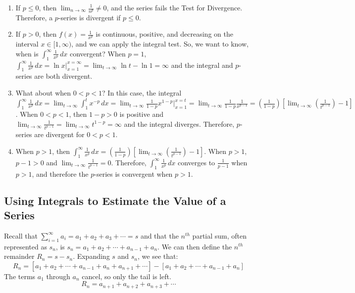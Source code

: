 \begin{Answer}[ref = pseries]
\begin{enumerate}
\item If $p \leq 0$, then $\lim_{n \to \infty} \frac{1}{n^p} \neq 0$, and the 
series fails the Test for Divergence. Therefore, a $p$-series is divergent if 
$p \leq 0$. 
\item If $p > 0$, then $f(x) = \frac{1}{x^p}$ is continuous, positive, and 
decreasing on the interval $x \in [1, \infty)$, and we can apply the integral 
test. So, we want to know, when is $\int_1^\infty \frac{1}{x^p}\,dx$ convergent? 
When $p=1$, $\int_1^\infty \frac{1}{x^p}\,dx = \ln{x}|_{x=1}^{x=\infty} = \lim_
{t \to \infty} \ln{t} - \ln{1} = \infty$ and the integral and $p$-series are 
both divergent.
\item What about when $0 < p < 1$? In this case, the integral $\int_1^\infty \frac{1}{
x^p}\,dx = \lim_{t \to \infty} \int_1^t x^{-p}\,dx = \lim_{t \to \infty} 
\frac{1}{1-p}x^{1-p}|_{x=1}^{x=t} = \lim_{t \to \infty} \frac{1}{1-p}\frac{1}{
x^{p-1}} = \left( \frac{1}{1-p} \right) \left[\lim_{t \to \infty} \left( \frac{
1}{t^{p-1}} \right) - 1 \right]$. When $0 < p < 1$, then $1 - p > 0$ is 
positive and $\lim_{t \to \infty} \frac{1}{t^{p-1}} = \lim_{t \to \infty} t^{1-
p} = \infty$ and the integral diverges. Therefore, $p$-series are divergent for 
$0 < p < 1$.
\item When $p > 1$, then $\int_1^\infty \frac{1}{x^p}\,dx = \left( \frac{1}{1-
p} \right) \left[\lim_{t \to \infty} \left( \frac{1}{t^{p-1}} \right) - 1 
\right]$. When $p > 1$, $p - 1 > 0$ and $\lim_{t \to \infty} \frac{1}{t^{p-1}} 
= 0$. Therefore, $\int_{1}^\infty \frac{1}{x^p}\,dx$ converges to $\frac{1}{p 
- 1}$ when $p > 1$, and therefore the $p$-series is convergent when $p > 1$. 
\end{enumerate}
\end{Answer}

\subsection{Using Integrals to Estimate the Value of a Series}
Recall that $\sum_{i=1}^\infty a_i = a_1 + a_2 + a_3 + \cdots = s$ and that 
the $n^{th}$ partial sum, often represented as $s_n$, is $s_n = a_1 + a_2 + 
\cdots + a_{n-1} + a_n$. We can then define the $n^{th}$ remainder $R_n = s - 
s_n$. Expanding $s$ and $s_n$, we see that:
$$R_n = \left[ a_1 + a_2 + \cdots + a_{n-1} + a_n + a_{n+1} + \cdots \right] - 
\left[ a_1 + a_2 + \cdots + a_{n-1} + a_{n} \right]$$
The terms $a_1$ through $a_n$ cancel, so only the tail is left.
$$R_n = a_{n+1} + a_{n+2} + a_{n+3} + \cdots$$

